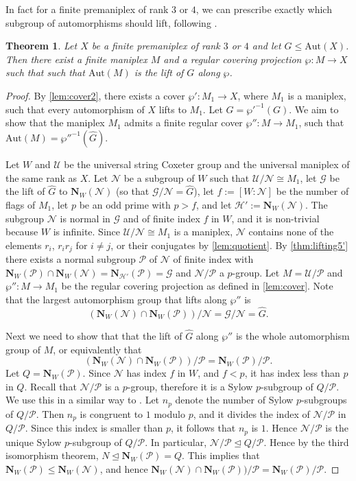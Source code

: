 \documentclass{amsart}
\theoremstyle{plain}
\newtheorem{theorem}{Theorem}[section]
\theoremstyle{definition}
\theoremstyle{remark}
\newcommand{\U}{\mathcal U}
\renewcommand{\P}{\mathcal P}
\newcommand{\N}{\mathcal N}
\renewcommand{\H}{\mathcal H}
\newcommand{\G}{\mathcal G}
\newcommand{\No}{\mathbf N}
\newcommand{\Aut}{\mathrm{Aut}}
\begin{document}
In fact for  a finite premaniplex of rank $3$ or $4$, we can prescribe exactly which
subgroup of automorphisms should lift, following \cite{PotocnikSpiga2019}.

\begin{theorem}\label{th:lift}
	Let $X$ be a finite premaniplex of rank $3$ or $4$ and let $G\le\Aut(X)$. Then there
	exist a finite maniplex $M$ and a regular covering projection $\wp\colon M\rightarrow X$
	such that
	such that $\Aut(M)$ is the lift of $G$ along $\wp$.
\end{theorem}

\begin{proof}
    By \cref{lem:cover2}, there exists a cover $\wp': M_1 \rightarrow X$, where $M_1$ is a maniplex, such that every automorphism of $X$ lifts to $M_1$. Let $\hat G = \wp'^{-1}(G)$. We aim to show that the maniplex $M_1$ admits a finite regular cover $\wp'': M \rightarrow M_1$, such that $\Aut(M) = \wp''^{-1}(\hat G)$. 

    Let $W$ and $\U$ be the universal string Coxeter group and the universal maniplex of the
	same rank as $X$.  
    Let $\N$ be a subgroup of $W$ such that 
  $\U/\N \cong M_1$, let $\G$ be the lift of $\hat G$ to $\No_W(\N)$ (so that
  $\G/\N=\hat G$), let $f:=[W:\N]$ be the number of flags of $M_1$, let $p$ be an odd prime with $p>f$, and
	let $\H':=\No_{W}(\N)$. The subgroup $\N$ is normal in $\G$ and of finite index $f$ in
	$W$, and it is non-trivial because $W$ is infinite. Since $\U/\N\cong M_1$ is a maniplex,
	$\N$ contains none of the elements $r_i$, $r_ir_j$ for $i\ne j$, or their conjugates by
	\cref{lem:quotient}. By \cref{thm:lifting5'} there exists a normal
	subgroup $\P$ of $\N$ of finite index with $\No_{W}(\P) \cap \No_{W}(\N)= \No_{\H'}(\P) = \G$ and 
     $\N/\P$ a $p$-group. Let $M = \U/\P$ and $\wp'': M \rightarrow M_1$ be the regular covering projection as defined in \cref{lem:cover}. Note that the largest automorphism group that lifts along $\wp''$ is 
     \[(\No_W(\N) \cap \No_W(\P))/\N =  \G/\N = \hat G.\] 
     
     Next we need to show that that the lift of $\hat G$ along $\wp''$ is the whole automorphism group of $M$, or equivalently that  \[(\No_W(\N) \cap \No_W(\P))/\P =  \No_W(\P)/\P.\]
     Let $Q = \No_W(\P)$. Since $\N$ has index $f$ in $W$, and $f < p$, it has index less than $p$ in $Q$. Recall that $\N/\P$ is a $p$-group, therefore it is a Sylow $p$-subgroup of $Q/\P$. We use this in a similar way to \cite{PotocnikSpiga2019}.
     Let $n_p$ denote the number of
	Sylow $p$-subgroups of $Q/\P$. Then $n_p$ is congruent to $1$ modulo $p$, and it divides
	the index of $\N/ \P$ in $Q/\P$. Since this index is smaller than $p$, it follows that $n_p$ is $1$. Hence $\N/\P$ is the unique Sylow $p$-subgroup of $Q/\P$. In particular, $\N/\P \trianglelefteq Q/\P$.  Hence by the third isomorphism theorem, $N \trianglelefteq \No_W(\P) = Q$. This implies that $\No_W(\P) \le \No_W(\N)$, and 
    hence $\No_W(\N) \cap \No_W(\P))/\P =  \No_W(\P)/\P$.


\end{proof}
\end{document}
